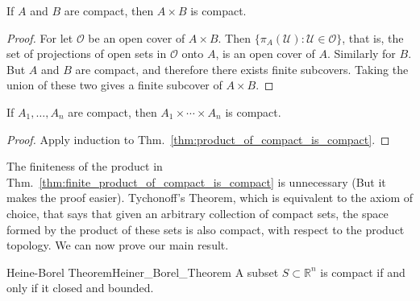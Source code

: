             \begin{theorem}
                \label{thm:product_of_compact_is_compact}%
                If $A$ and $B$ are compact, then $A\times{B}$ is compact.
            \end{theorem}
            \begin{proof}
                For let $\mathcal{O}$ be an open cover of $A\times{B}$. Then
                $\{\pi_{A}(\mathcal{U}):\mathcal{U}\in\mathcal{O}\}$, that is,
                the set of projections of open sets in $\mathcal{O}$ onto $A$,
                is an open cover of $A$. Similarly for $B$. But $A$ and $B$ are
                compact, and therefore there exists finite subcovers. Taking
                the union of these two gives a finite subcover of $A\times{B}$.
            \end{proof}
            \begin{theorem}
                \label{thm:finite_product_of_compact_is_compact}%
                If $A_{1},\hdots,A_{n}$ are compact, then
                $A_{1}\times\cdots\times{A_{n}}$ is compact.
            \end{theorem}
            \begin{proof}
                Apply induction to
                Thm.~\ref{thm:product_of_compact_is_compact}.
            \end{proof}
            The finiteness of the product in
            Thm.~\ref{thm:finite_product_of_compact_is_compact} is unnecessary
            (But it makes the proof easier). Tychonoff's Theorem, which is
            equivalent to the axiom of choice, that says that given an
            arbitrary collection of compact sets, the space formed by the
            product of these sets is also compact, with respect to the product
            topology. We can now prove our main result.
            \begin{ftheorem}{Heine-Borel Theorem}{Heiner_Borel_Theorem}
                A subset $S\subset\mathbb{R}^{n}$ is compact if
                and only if it closed and bounded.
            \end{ftheorem}
